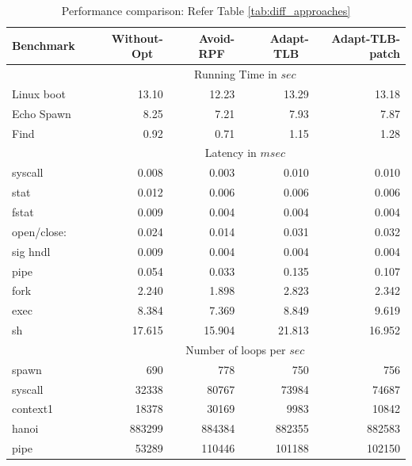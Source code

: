 \documentclass[10pt,twocolumn]{article}
\begin{document}
\begin{table}
\centering
\caption{Performance comparison: Refer Table \ref{tab:diff_approaches}}
      \begin{tabular}{|l|  r r r r|} \hline
	         Benchmark\verb, ,& Without-Opt \verb, ,& Avoid-RPF \verb, , & Adapt-TLB \verb, ,& Adapt-TLB-patch \\ \hline

     & \multicolumn{4}{c|}{ Running Time in $sec$}\\ \cline {2-5}  
     Linux boot	&	13.10	&	12.23	&	13.29	&	13.18	\\
Echo Spawn	&	8.25	&	7.21	&	7.93	&	7.87	\\
Find	&	0.92	&	0.71	&	1.15	&	1.28	\\ \cline{2-5}
	   
     & \multicolumn{4}{c|}{Latency in $msec$}\\  \cline{2-5}
syscall	&	0.008	&	0.003	&	0.010	&	0.010	\\
stat	&	0.012	&	0.006	&	0.006	&	0.006	\\
fstat	&	0.009	&	0.004	&	0.004	&	0.004	\\
open/close:	&	0.024	&	0.014	&	0.031	&	0.032	\\
sig hndl	&	0.009	&	0.004	&	0.004	&	0.004	\\
pipe 	&	0.054	&	0.033	&	0.135	&	0.107	\\
fork	&	2.240	&	1.898	&	2.823	&	2.342	\\
exec	&	8.384	&	7.369	&	8.849	&	9.619	\\
sh	&	17.615	&	15.904	&	21.813	&	16.952	\\ \cline{2-5}
     & \multicolumn{4}{c|}{Number of loops per $sec$}\\  \cline{2-5}

spawn	&	690	&	778	&	750	&	756	\\	
syscall	&	32338	&	80767	&	73984	&	74687	\\	
context1	&	18378	&	30169	&	9983	&	10842	\\	
hanoi	&	883299	&	884384	&	882355	&	882583	\\	
pipe	&	53289	&	110446	&	101188	&	102150	\\	

        \hline
      \end{tabular}
\label{tab:perf_approaches}
\end{table} 
\end{document}
